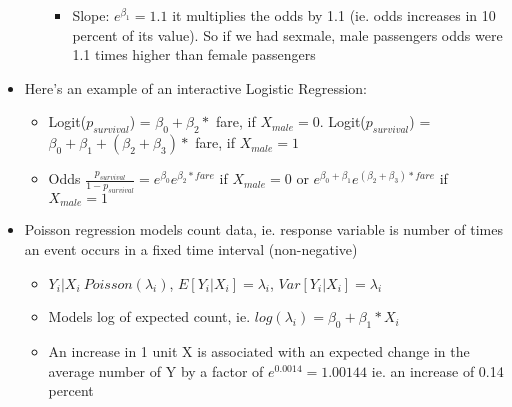 \documentclass[8pt,landscape,a4paper, fleqn, dvipsnames]{extarticle}
\begin{document}
\begin{multicols*}{4}
\begin{itemize}
\begin{itemize}
\begin{itemize}
            \item Slope: $e^{\beta_1} = 1.1$ it multiplies the odds by 1.1 (ie. odds increases in 10 percent of its value). So if we had sexmale, male passengers odds were 1.1 times higher than female passengers
        \end{itemize}
    \end{itemize}
    \item Here's an example of an interactive Logistic Regression:
    \begin{itemize}
        \item Logit($p_{survival}$) = $\beta_0 + \beta_2 *$ fare, if $X_{male} = 0$.  Logit($p_{survival}$) = $\beta_0 + \beta_1 + (\beta_2 + \beta_3) *$ fare, if $X_{male} = 1$
        \item Odds $\frac{p_{survival}}{1 - p_{survival}} = e^{\beta_0} e^{\beta_2 * fare}$ if $X_{male} = 0$ or $e^{\beta_0 + \beta_1} e^{(\beta_2 + \beta_3)* fare}$ if $X_{male} = 1$
    \end{itemize}
    \item Poisson regression models count data, ie. response variable is number of times an event occurs in a fixed time interval (non-negative)
    \begin{itemize}
        \item $Y_i | X_i ~ Poisson(\lambda_i)$, $E[Y_i | X_i ] = \lambda_i$, $Var[Y_i | X_i ] = \lambda_i$
        \item Models log of expected count, ie. $log(\lambda_i) = \beta_0 + \beta_1 * X_i$
        \item An increase in 1 unit X is associated with an expected change in the average number of Y by a factor of $e^{0.0014} = 1.00144$ ie. an increase of 0.14 percent
    \end{itemize}
\end{itemize}


\end{multicols*}
\end{document}
